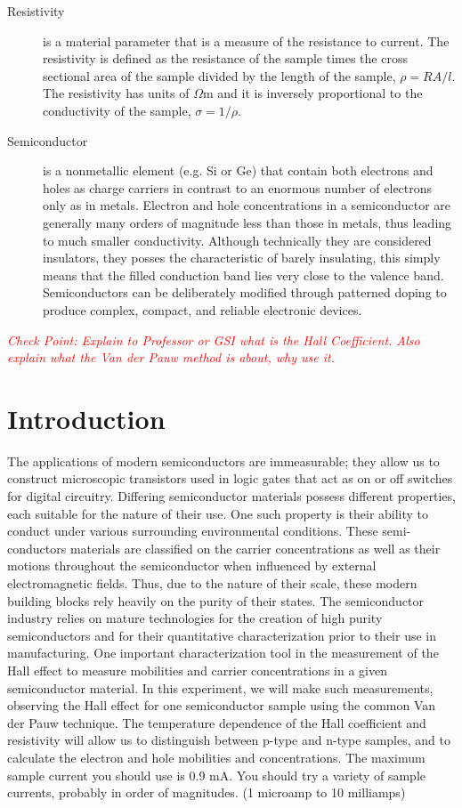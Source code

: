 \documentclass{../lab}
\begin{document}
\begin{description}
    \item[Resistivity] is a material parameter that is a measure of the resistance to current. The resistivity is defined as the resistance of the sample times the cross sectional area of the sample divided by the length of the sample, $\rho = RA/l $. The resistivity has units of $\Omega$m and it is inversely proportional to the conductivity of the sample, $\sigma = 1/\rho$.

    \item[Semiconductor] is a nonmetallic element (e.g. Si or Ge) that contain both electrons and holes as charge carriers in contrast to an enormous number of electrons only as in metals. Electron and hole concentrations in a semiconductor are generally many orders of magnitude less than those in metals, thus leading to much smaller conductivity. Although technically they are considered insulators, they posses the characteristic of barely insulating, this simply means that the filled conduction band lies very close to the valence band. Semiconductors can be deliberately modified through patterned doping to produce complex, compact, and reliable electronic devices.
\end{description}

\noindent\textcolor{red}{\emph{Check Point: Explain to Professor or GSI what is the Hall Coefficient.  Also explain what the Van der Pauw method is about, why use it.}}

\section{Introduction}

The applications of modern semiconductors are immeasurable; they allow us to construct microscopic transistors used in logic gates that act as on or off switches for digital circuitry. Differing semiconductor materials possess different properties, each suitable for the nature of their use. One such property is their ability to conduct under various surrounding environmental conditions. These semi-conductors materials are classified on the carrier concentrations as well as their motions throughout the semiconductor when influenced by external electromagnetic fields. Thus, due to the nature of their scale, these modern building blocks rely heavily on the purity of their states. The semiconductor industry relies on mature technologies for the creation of high purity semiconductors and for their quantitative characterization prior to their use in manufacturing. One important characterization tool in the measurement of the Hall effect to measure mobilities and carrier concentrations in a given semiconductor material. In this experiment, we will make such measurements, observing the Hall effect for one semiconductor sample using the common Van der Pauw technique. The temperature dependence of the Hall coefficient and resistivity will allow us to distinguish between p-type and n-type samples, and to calculate the electron and hole mobilities and concentrations. The maximum sample current you should use is 0.9 mA. You should try a variety of sample currents, probably in order of magnitudes. (1 microamp to 10 milliamps)
\end{document}
